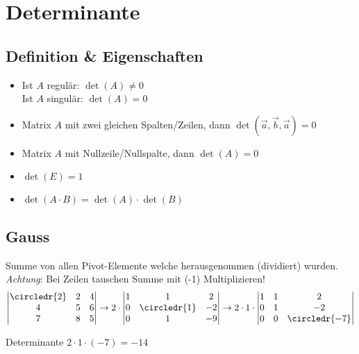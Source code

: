 \section{Determinante}\label{detmenge}

\subsection{Definition \& Eigenschaften}
\begin{itemize}[nosep]
	\item Ist $A$ regulär: $\det(A) \neq 0$\\
	      Ist $A$ singulär: $\det(A) = 0$
	\item Matrix $A$ mit zwei gleichen Spalten/Zeilen, dann $\det(\vec{a}, \vec{b}, \vec{a}) = 0$
	\item Matrix $A$ mit Nullzeile/Nullspalte, dann $\det(A) = 0$
	\item $\det(E) = 1$
	\item $\det(A \cdot B) = \det(A) \cdot \det(B)$
\end{itemize}

\subsection{Gauss}
Summe von allen Pivot-Elemente welche herausgenommen (dividiert) wurden. \textit{Achtung}: Bei Zeilen tauschen Summe mit (-1) Multiplizieren!
\[
	\begin{vmatrix}
		\circledr{2} & 2 & 4 \\
		4 & 5 & 6 \\
		7 & 8 & 5 \\
	\end{vmatrix}
	\rightarrow
	2 \cdot \begin{vmatrix}
		1 & 1 & 2 \\
		0 & \circledr{1} & -2 \\
		0 & 1 & -9 \\
	\end{vmatrix}
	\rightarrow
	2 \cdot 1 \cdot \begin{vmatrix}
	1 & 1 & 2 \\
	0 & 1 & -2 \\
	0 & 0 & \circledr{-7} \\
\end{vmatrix}
\]

Determinante $2 \cdot 1 \cdot (-7) = -14$

